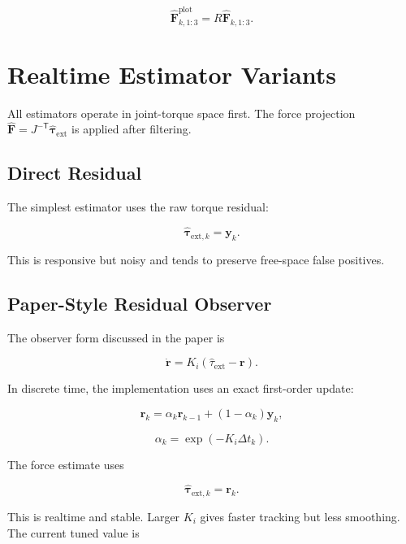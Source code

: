 \documentclass[11pt]{article}
\newcommand{\Fhat}{\hat{\bm F}}
\begin{document}
\begin{equation}
\Fhat_{k,1:3}^{\mathrm{plot}}
= R \Fhat_{k,1:3}.
\end{equation}

\section{Realtime Estimator Variants}

All estimators operate in joint-torque space first. The force projection
\(\Fhat = J^{-\mathsf{T}}\hat{\bm \tau}_{\mathrm{ext}}\) is applied after filtering.

\subsection{Direct Residual}

The simplest estimator uses the raw torque residual:

\begin{equation}
\hat{\bm \tau}_{\mathrm{ext},k} = \bm y_k .
\end{equation}

This is responsive but noisy and tends to preserve free-space false positives.

\subsection{Paper-Style Residual Observer}

The observer form discussed in the paper is

\begin{equation}
\dot{\bm r}
= K_i(\hat{\tau}_{\mathrm{ext}} - \bm r).
\end{equation}

In discrete time, the implementation uses an exact first-order update:

\begin{equation}
\bm r_k
= \alpha_k \bm r_{k-1}
+ (1-\alpha_k)\bm y_k,
\end{equation}

\begin{equation}
\alpha_k = \exp(-K_i\Delta t_k).
\end{equation}

The force estimate uses

\begin{equation}
\hat{\bm \tau}_{\mathrm{ext},k} = \bm r_k .
\end{equation}

This is realtime and stable. Larger \(K_i\) gives faster tracking but less
smoothing. The current tuned value is
\end{document}
